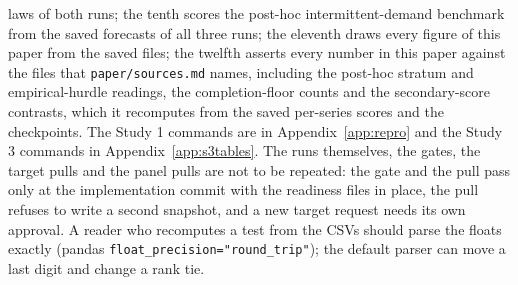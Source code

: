 laws of both runs; the tenth scores the post-hoc intermittent-demand benchmark from the saved forecasts of
all three runs; the eleventh draws every figure of this paper from the saved files; the twelfth asserts
every number in this paper against the files that \texttt{paper/sources.md} names, including the post-hoc
stratum and empirical-hurdle readings, the completion-floor counts and the secondary-score contrasts, which
it recomputes from the saved per-series scores and the checkpoints. The Study 1 commands are in
Appendix~\ref{app:repro} and the Study 3 commands in Appendix~\ref{app:s3tables}. The runs themselves, the
gates, the target pulls and the panel pulls are not to be repeated: the gate and the pull pass only at the
implementation commit with the readiness files in place, the pull refuses to write a second snapshot, and a
new target request needs its own approval. A reader who recomputes a test from the CSVs should parse the
floats exactly (pandas \texttt{float\_precision="round\_trip"}); the default parser can move a last digit and
change a rank tie.
